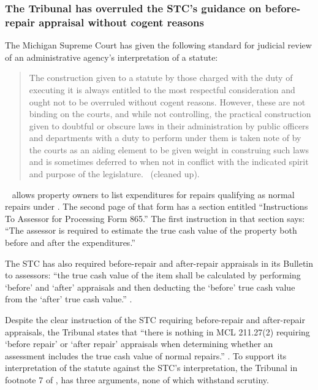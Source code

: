 \documentclass[12pt,\documentclassflag]{michiganCourtOfAppealsBrief}
\begin{document}
\subsubsection{The Tribunal has overruled the STC's guidance on before-repair appraisal without cogent reasons}
  

The Michigan Supreme Court has given the following standard for judicial review of an administrative agency's interpretation of a statute:

\begin{quote}
The construction given to a statute by those charged with the duty of executing it is always entitled to the most respectful consideration and ought not to be overruled without cogent reasons. However, these are not binding on the courts, and while not controlling, the practical construction given to doubtful or obscure laws in their administration by public officers and departments with a duty to perform under them is taken note of by the courts as an aiding element to be given weight in construing such laws and is sometimes deferred to when not in conflict with the indicated spirit and purpose of the legislature. \ (cleaned up).
\end{quote}

\stcform\
allows property owners to list expenditures for repairs qualifying as normal repairs under \mathieuGast. The second page of that form has a section entitled ``Instructions To Assessor for Processing Form 865.'' The first instruction in that section says: ``The assessor is required to estimate the true cash value of the property both before and after the expenditures.''

The STC has also required before-repair and after-repair appraisals in its Bulletin to assessors: ``the true cash value of the item shall be
calculated by performing `before' and `after' appraisals and then deducting the `before' true cash value from the `after' true cash value.'' .

Despite the clear instruction of the STC requiring before-repair and after-repair appraisals, the Tribunal states that ``there is nothing in MCL 211.27(2) requiring `before repair' or `after repair' appraisals when determining whether an assessment includes the true cash value of normal repairs.'' \reconsiderationDenied[2]. To support its interpretation of the statute against the STC's interpretation,  the Tribunal in footnote 7 of \reconsiderationDenied[2], has three arguments, none of which withstand scrutiny.
\end{document}

